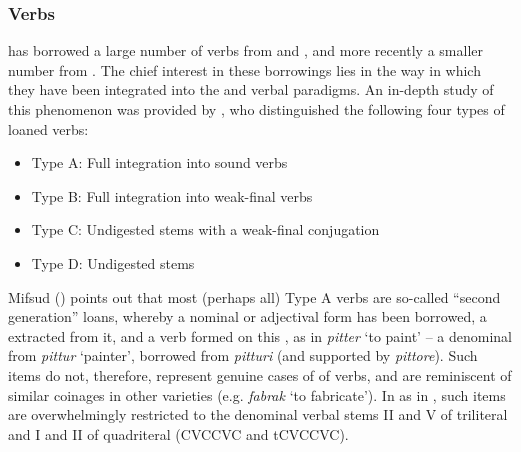 \documentclass[output=paper]{langsci/langscibook}
\begin{document}
\subsubsection{Verbs}\label{verbmorphology}

\label{loanedverbs}
 has borrowed a large number of verbs from  and , and more recently a smaller number from . The chief interest in these borrowings lies in the way in which they have been integrated into the   and  verbal paradigms. An in-depth study of this phenomenon was provided by \cite{mifsudloanverbs}, who distinguished the following four types of loaned verbs:

\begin{itemize}[noitemsep]
	\item[] Type A: Full integration into   sound verbs
    \item[] Type B: Full integration into   weak-final verbs
    \item[] Type C: Undigested  stems with a weak-final conjugation
    \item[] Type D: Undigested  stems
\end{itemize}


Mifsud (\citeyear[58]{mifsudloanverbs}) points out that most (perhaps all) Type A verbs are so-called ``second generation'' loans, whereby a nominal or adjectival form has been borrowed, a  extracted from it, and a verb formed on this , as in \textit{pitter} `to paint' -- a denominal  from \textit{pittur} `painter', borrowed from  \textit{pitturi} (and supported by  \textit{pittore}). Such items do not, therefore, represent genuine cases of  of verbs, and are reminiscent of similar coinages in other  varieties (e.g. \textit{fabrak} `to fabricate'). In  as in , such items are overwhelmingly restricted to the denominal verbal stems II and V of triliteral  and I and II of quadriteral  (CVCCVC and tCVCCVC).
\end{document}
